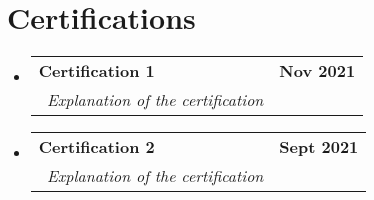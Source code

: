 \documentclass[letterpaper,11pt]{article}
\makeatletter
\newcommand{\resumeSubheading}[4]{
	\vspace{-2pt}\item
	\begin{tabular*}{1.0\textwidth}[t]{l@{\extracolsep{\fill}}r}
		\textbf{#1} & \textbf{\small #2} \\
		\textit{\small#3} & \textit{\small #4} \\
	\end{tabular*}\vspace{-7pt}
}
\newcommand{\resumeSubHeadingListStart}{\begin{itemize}[leftmargin=0.0in, label={}]}
\newcommand{\resumeSubHeadingListEnd}{\end{itemize}}
\makeatother
\begin{document}
	\section{Certifications}
		\resumeSubHeadingListStart
		\resumeSubheading
			{Certification 1}{Nov 2021}
			{~Explanation of the certification}{}
		\resumeSubheading
			{Certification 2}{Sept 2021}
			{~Explanation of the certification}{}
		\resumeSubHeadingListEnd
		
\end{document}
